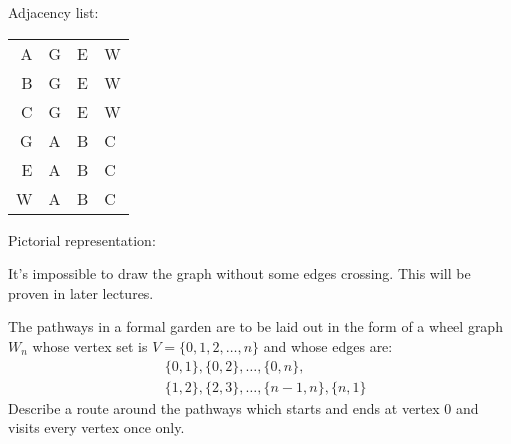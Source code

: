 \documentclass[a4paper, 12pt]{exam}
\begin{document}
\begin{questions}
\begin{solution}
		Adjacency list:
		\begin{center}
  		\begin{tabular}{r|lll}
  			A & G & E & W \\
  			B & G & E & W \\
  			C & G & E & W \\
  			G & A & B & C \\
  			E & A & B & C \\
  			W & A & B & C
  		\end{tabular}
		\end{center}
		
		Pictorial representation:
		\begin{center}
  	 \begin{adjustbox}{max width=0.6\textwidth}
			\end{adjustbox}
		\end{center}
		It's impossible to draw the graph without some edges crossing.
		This will be proven in later lectures.
	\end{solution}
	


\question
  The pathways in a formal garden are to be laid out in the form of a wheel graph $W_n$ whose vertex set is $V = \{0,1,2,\ldots,n\}$ and whose edges are:
  \begin{align*}
  	&\{0,1\}, \{0,2\}, \ldots, \{0,n\}, \\
  	&\{1,2\}, \{2,3\}, \ldots, \{n-1,n\}, \{n,1\}
  \end{align*}
  Describe a route around the pathways which starts and ends at vertex 0 and visits every vertex once only.~\cite{biggs02}


\end{questions}
\end{document}
